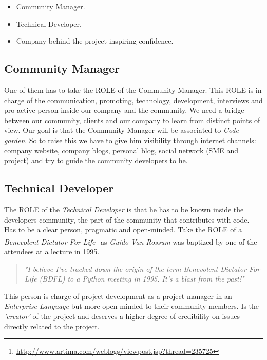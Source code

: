\documentclass[11pt]{scrartcl}
\begin{document}
\begin{itemize}
	\item Community Manager.
	\item Technical Developer.
	\item Company behind the project inspiring confidence.
\end{itemize}

\subsection{Community Manager}
\label{sub:community-manager}

\par One of them has to take the ROLE of the Community Manager. This ROLE is in charge of the communication, promoting, technology, development, interviews and pro-active person inside our company and the community. We need a bridge between our community, clients and our company to learn from distinct points of view. Our goal is that the Community Manager will be associated to \emph{Code garden}. So to raise this we have to give him visibility through internet channels: company website, company blogs, personal blog, social network (SME and project) and try to guide the community developers to he.


\subsection{Technical Developer}
\label{sub:tech-developer}

\par The ROLE of the \emph{Technical Developer} is that he has to be known inside the developers community, the part of the community that contributes with code. Has to be a clear person, pragmatic and open-minded. Take the ROLE of a \emph{Benevolent Dictator For Life}\footnote{\url{http://www.artima.com/weblogs/viewpost.jsp?thread=235725}} as \emph{Guido Van Rossum} was baptized by one of the attendees at a lecture in 1995.

\begin{quotation}
    \emph{"I believe I've tracked down the origin of the term Benevolent Dictator For Life (BDFL) to a Python meeting in 1995. It's a blast from the past!"}
\end{quotation}

\par This person is charge of project development as a project manager in an \emph{Enterprise Language} but more open minded to their community members. Is the \emph{'creator'} of the project and deserves a higher degree of credibility on issues directly related to the project.
\end{document}
